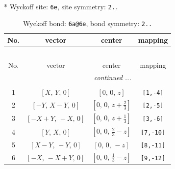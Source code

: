 \documentclass[fleqn,8pt]{jsarticle}
\begin{document}
* Wyckoff site: {\tt 6e}, site symmetry: {\tt 2..}
\renewcommand{\arraystretch}{1.2}
\begin{longtable}{cccc}
\caption{Wyckoff bond: {\tt 6a@6e}, bond symmetry: {\tt 2..}}
 \\
 \hline \hline
No. & vector & center & mapping \\ \hline \endfirsthead

\multicolumn{3}{l}{\tablename\ \thetable{}} \\
 \hline \hline
No. & vector & center & mapping \\ \hline \endhead

 \hline \hline
\multicolumn{3}{r}{\footnotesize\it continued ...} \\ \endfoot

 \hline \hline
\multicolumn{3}{r}{} \\ \endlastfoot

1 & $\left[ X,\, Y,\, 0 \right]$ & $\left[ 0,\, 0,\, z \right]$ & {\tt [1,-4]} \\ \hline
2 & $\left[ - Y,\, X - Y,\, 0 \right]$ & $\left[ 0,\, 0,\, z + \frac{2}{3} \right]$ & {\tt [2,-5]} \\ \hline
3 & $\left[ - X + Y,\, - X,\, 0 \right]$ & $\left[ 0,\, 0,\, z + \frac{1}{3} \right]$ & {\tt [3,-6]} \\ \hline
4 & $\left[ Y,\, X,\, 0 \right]$ & $\left[ 0,\, 0,\, \frac{2}{3} - z \right]$ & {\tt [7,-10]} \\ \hline
5 & $\left[ X - Y,\, - Y,\, 0 \right]$ & $\left[ 0,\, 0,\, - z \right]$ & {\tt [8,-11]} \\ \hline
6 & $\left[ - X,\, - X + Y,\, 0 \right]$ & $\left[ 0,\, 0,\, \frac{1}{3} - z \right]$ & {\tt [9,-12]} \\
\end{longtable}
\renewcommand{\arraystretch}{1.2}
\end{document}
